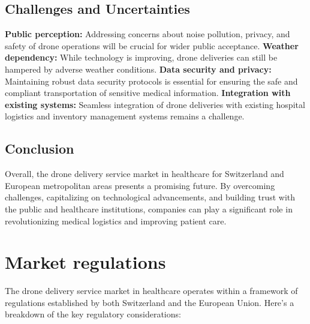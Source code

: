 \subsection{Challenges and Uncertainties}
\textbf{Public perception:} Addressing concerns about noise pollution, privacy, and safety of drone operations will be crucial for wider public acceptance.
\newline
\textbf{Weather dependency:} While technology is improving, drone deliveries can still be hampered by adverse weather conditions.
\newline
\textbf{Data security and privacy:} Maintaining robust data security protocols is essential for ensuring the safe and compliant transportation of sensitive medical information.
\newline
\textbf{Integration with existing systems:} Seamless integration of drone deliveries with existing hospital logistics and inventory management systems remains a challenge.
\subsection{Conclusion}
Overall, the drone delivery service market in healthcare for Switzerland and European metropolitan areas presents a promising future. By overcoming challenges, capitalizing on technological advancements, and building trust with the public and healthcare institutions, companies can play a significant role in revolutionizing medical logistics and improving patient care.
\section{Market regulations}
The drone delivery service market in healthcare operates within a framework of regulations established by both Switzerland and the European Union. Here's a breakdown of the key regulatory considerations:
